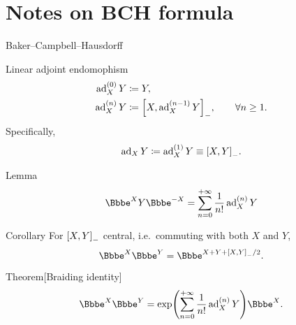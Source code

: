 \section{Notes on BCH formula}

Baker--Campbell--Hausdorff

\begin{nameddef}{Linear adjoint endomophism}
\begin{align}
	\operatorname{ad}_X^{(0)} Y &\coloneqq Y, \\
	\operatorname{ad}_X^{(n)} Y &\coloneqq {\left[X, \operatorname{ad}_X^{(n-1)} Y\right]}_-,\qquad\forall n\ge 1.\\
\end{align}
Specifically,
\begin{equation}
	\operatorname{ad}_X Y \coloneqq \operatorname{ad}_X^{(1)} Y \equiv {\left[X, Y\right]}_-.
\end{equation}
\end{nameddef} %

\begin{namedthm}{Lemma}
\begin{equation}
	\ee^{X} Y \ee^{-X} = \sum_{n=0}^{+\infty} \frac{1}{n!}\ad_X^{(n)}Y
	\label{eq:bch-sandwich}
\end{equation}
\label{lem:bch-sandwich}
\end{namedthm} %

\begin{namedthm}{Corollary}
	For ${\left[X, Y\right]}_-$ central, i.e.\ commuting with both $X$ and $Y$,
	\begin{equation}
		\ee^X\ee^Y = \ee^{X+Y+\sbr{X, Y}_-/2}.
	\end{equation}
	\label{thm:bch-merging}
\end{namedthm} %


\begin{namedthm}{Theorem}[Braiding identity]
\begin{equation}
\ee^X \ee^Y = \rfun{\exp}{\sum_{n=0}^{+\infty} \frac{1}{n!}\ad_X^{(n)}Y}\ee^X.
\end{equation}
\label{thm:bch-brading}
\end{namedthm} %


